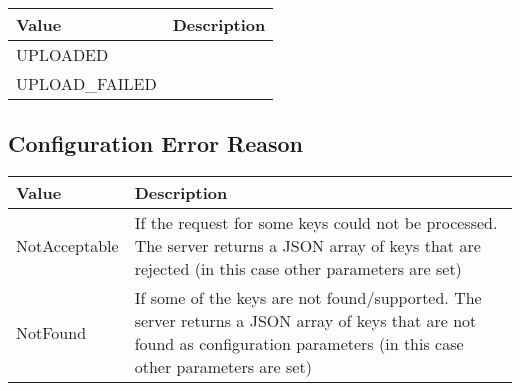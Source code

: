 \begin{tabularx}{\linewidth}{ | l | X | }
  \hline
  \rowcolor{table-head}
  Value & Description \\
  \hline
  UPLOADED 		&  \\
  UPLOAD\_FAILED 	&  \\
  \hline
\end{tabularx}



\subsection{Configuration Error Reason}
\label{types:ConfigErrorReason}

\begin{tabularx}{\linewidth}{ | l | X | }
  \hline
  \rowcolor{table-head}
  Value & Description \\
  \hline
  NotAcceptable 		& If the request for some keys could not be processed. The server returns a JSON array of keys that are rejected (in this case other parameters are set) \\
  NotFound 	& If some of the keys are not found/supported. The server returns a JSON array of keys that are not found as configuration parameters (in this case other parameters are set) \\
  \hline
\end{tabularx}

%

